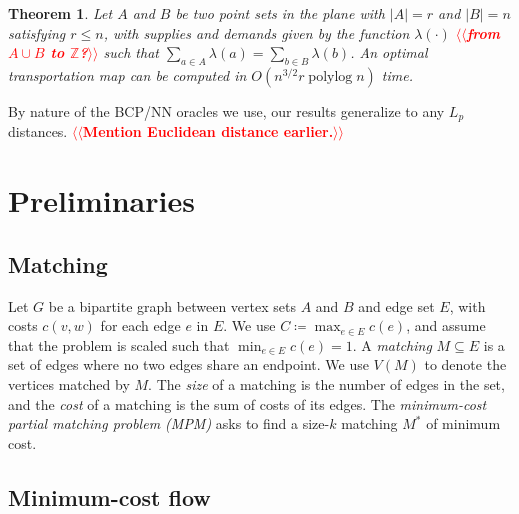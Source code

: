 \documentclass[11pt]{article}
\makeatletter
\def\polylog{\mathop{\mathrm{polylog}}}
\def\tsupply{\lambda}
\theoremstyle{plain}
\newtheorem{theorem}[lemma]{Theorem}
\numberwithin{figure}{section}
\def\n@te#1{\textsf{\boldmath \textbf{$\langle\!\langle$#1$\rangle\!\rangle$}}\leavevmode}
\def\note#1{\textcolor{red}{\n@te{#1}}}
\makeatother
\begin{document}
\begin{theorem}
\label{theorem:orlin}
Let $A$ and $B$ be two point sets in the plane with $|A| = r$ and $|B| = n$ satisfying $r \le n$, with
supplies and demands given by the function $\tsupply(\cdot)$ \note{from $A\cup B$ to $\mathbb{Z}$?} such that
$\sum_{a \in A} \tsupply(a) = \sum_{b \in B} \tsupply(b)$.
An optimal transportation map can be computed in $O(n^{3/2}r\polylog n)$ time.
\end{theorem}



By nature of the BCP/NN oracles we use, our results generalize to any $L_p$ distances. \note{Mention Euclidean distance earlier.}


\section{Preliminaries}
\label{section:prelim}

\subsection{Matching}

Let $G$ be a bipartite graph between vertex sets $A$ and $B$ and edge set $E$,
with costs $c(v, w)$ for each edge $e$ in $E$.
We use $C \coloneqq \max_{e \in E} c(e)$, and assume that the problem is scaled such
that $\min_{e \in E} c(e) = 1$.
A \emph{matching} $M \subseteq E$ is a set of edges where no two edges share an
endpoint.
We use $V(M)$ to denote the vertices matched by $M$.
The \emph{size} of a matching is the number of edges in the set, and the
\emph{cost} of a matching is the sum of costs of its edges.
The \emph{minimum-cost partial matching problem (MPM)} asks to find a size-$k$
matching $M^*$ of minimum cost.

\subsection{Minimum-cost flow}
\end{document}
